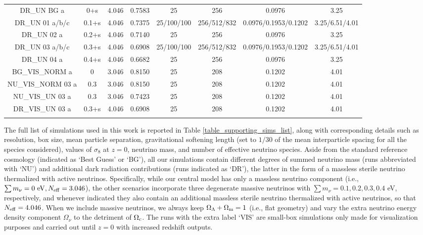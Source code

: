 \documentclass{emulateapj}
\begin{document}
\begin{table*}
\begin{center}
\begin{tabular}{cccccccc}
DR\_UN BG  a & 0+s       &4.046& 0.7583 & 25 & 256 & 0.0976 &  { 3.25} \\
DR\_UN 01  a/b/c & 0.1+s       &4.046& 0.7375 & 25/100/100 & 256/512/832 & 0.0976/0.1953/0.1202 &  { 3.25/6.51/4.01} \\
DR\_UN 02  a       & 0.2+s       &4.046& 0.7140 & 25 & 256  & 0.0976  &  { 3.25} \\
DR\_UN 03  a/b/c & 0.3+s       &4.046& 0.6908 & 25/100/100 & 256/512/832 & 0.0976/0.1953/0.1202 &  {3.25/6.51/4.01} \\
DR\_UN 04  a       & 0.4+s       &4.046& 0.6682 & 25 & 256  & 0.0976  &  { 3.25} \\

\hline
BG\_VIS\_NORM  a & 0           &3.046 & 0.8150             &     25 & 208 & 0.1202 &  { 4.01} \\
NU\_VIS\_NORM 03  a  & 0.3 &3.046          & 0.8150             &     25 & 208 & 0.1202 &  { 4.01} \\
NU\_VIS\_UN 03  a  & 0.3 &3.046          &  0.7423            &     25 & 208 & 0.1202 &  { 4.01} \\
DR\_VIS\_UN 03   a  & 0.3+s  &4.046         & 0.6908            &     25 & 208 & 0.1202 &  { 4.01} \\

\hline
\label{table_supporting_sims_list}
\end{tabular}
\end{center}
\end{table*}


The full list of simulations used in this work is reported in Table \ref{table_supporting_sims_list}, along with corresponding details such as resolution, box size, mean particle separation,  gravitational softening length 
(set to $1/30$ of the mean interparticle spacing for all the species considered),
values of $\sigma_8$ at $z=0$, neutrino mass, and number of effective neutrino species.
Aside from the standard reference cosmology (indicated as `Best Guess' or `BG'), all our simulations contain different degrees of summed
 neutrino mass (runs abbreviated with `NU') and additional dark radiation contributions (runs indicated as `DR'), the latter in the form of a massless sterile neutrino thermalized with active neutrinos.
Specifically, 
 while our central model has only a 
massless neutrino component (i.e., $\sum m_{\nu}=0~{\rm eV}, N_{\rm eff}=3.046$), the other scenarios  
incorporate three degenerate  massive neutrinos with $\sum m_{\nu} =0.1, 0.2, 0.3, 0.4 $ eV, respectively, 
and whenever indicated they also contain an additional massless sterile neutrino thermalized with active neutrinos, so that
$N_{\rm eff}=4.046$.  When we include massive neutrinos, we always keep $\Omega_{\Lambda} + \Omega_{\rm m}=1$  (i.e., flat geometry) 
and vary the extra  neutrino energy density component $\Omega_{\nu}$ to the detriment of $\Omega_{\rm c}$. 
The runs with the extra label `VIS' are small-box simulations only made for visualization purposes and carried out until $z=0$ with increased redshift outputs.
\end{document}
